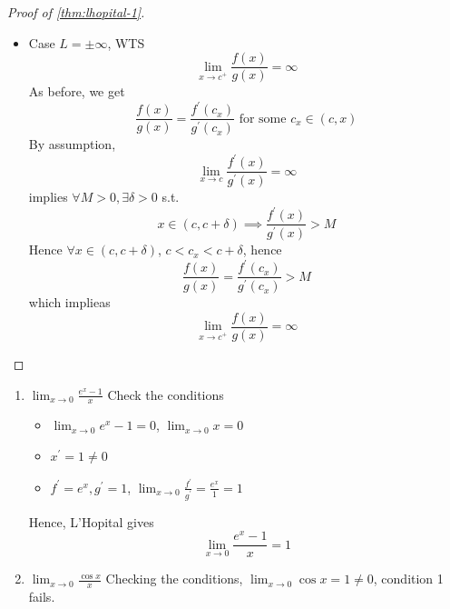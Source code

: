 \begin{proof}[Proof of 
    \ref{thm:lhopital-1}
]
\begin{itemize}
    \textbf{Step 2}: by assumption, we have 
    \[
        \lim_{x \to c^{-}} \frac{f^{\prime}(x)}{g^{\prime}(x)} = L
    \]
    hence $\forall \ep, \exists \delta$ s.t. 
    \[
        x \in (c - \delta, c) \implies 
        \left| 
            \frac{f^{\prime}(x)}{g^{\prime}(x)} - L 
        \right|  < \ep
    \]
    For any such $x$, since $x < c_x < c$, therefore
    $ c- \delta < c_x < c$. Hence
    \[
        \left| 
            \frac{f^{\prime}(c_x)}{g^{\prime}(c_x)} - L
        \right|  < \ep
    \]
    Therefore 
    \[
        \lim_{x \to c} \frac{f^{\prime}(c_x)}{g^{\prime}(c_x)} = L 
        \implies
        \lim_{x \to c} \frac{f(x)}{g(x)} = L 
    \]
    
    \item Case $L = \pm \infty$,
    WTS 
    \[
        \lim_{x \to c^{+}} \frac{f(x)}{g(x)} = \infty
    \]
    As before, we get
    \[
        \frac{f(x)}{g(x)} = \frac{f^{\prime}(c_x)}{g^{\prime}(c_x)}
        \text{ for some } c_x \in (c, x)
    \]
    By assumption, 
    \[
        \lim_{x \to c} \frac{f^{\prime}(x)}{g^{\prime}(x)} = \infty
    \]
    implies $\forall M > 0, \exists \delta > 0$ s.t. 
    \[
        x \in (c, c + \delta) \implies \frac{f^{\prime}(x)}{g^{\prime}(x)} > M
    \]
    Hence $\forall x \in (c, c + \delta)$, 
    $c < c_x < c+ \delta$, hence 
    \[
        \frac{f(x)}{g(x)} = \frac{f^{\prime}(c_x)}{g^{\prime}(c_x)}
        > M
    \]
    which implieas 
    \[
        \lim_{x \to c^{+}} \frac{f(x)}{g(x)} = \infty
    \]
\end{itemize} 
\end{proof}

\begin{example}
    \begin{enumerate}
        \item $\lim_{x \to 0} \frac{e^{x} - 1}{x}$
        Check the conditions
        \begin{itemize}
            \item $\lim_{x \to 0} e^{x} - 1 = 0$, $\lim_{x \to 0}x  = 0$
            \item $x^{\prime} = 1 \neq 0$
            \item $f^{\prime} = e^{x}, g^{\prime} = 1$, 
            $\lim_{x \to 0} \frac{f^{\prime}}{g^{\prime}} = \frac{e^{x}}{1} = 1$
        \end{itemize} 
        Hence, L'Hopital gives 
        \[
            \lim_{x \to 0} \frac{e^{x} - 1}{x} = 1
        \]
        \item $\lim_{x \to 0} \frac{\cos x}{x}$
        Checking the conditions, $\lim_{x \to 0}\cos x = 1 \neq 0$,
        condition 1 fails.
    \end{enumerate} 
\end{example}

